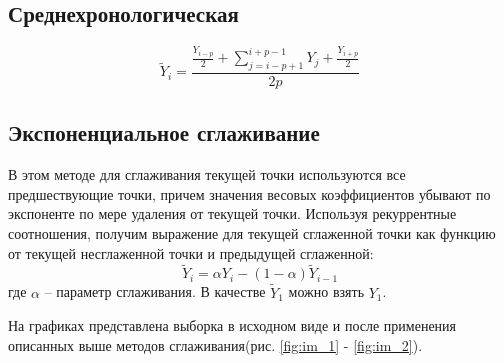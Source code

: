 \documentclass[a4paper,12pt]{article}
\begin{document}
\subsection{Среднехронологическая}
$$\tilde{Y}_i = \frac{\frac{Y_{i-p}}{2} + \sum\limits_{j=i-p+1}^{i+p-1}Y_j+\frac{Y_{i+p}}{2}}{2p}$$

\subsection{Экспоненциальное сглаживание}
В этом методе для сглаживания текущей точки используются все предшествующие точки, причем значения весовых коэффициентов убывают по экспоненте по мере удаления от текущей точки. Используя рекуррентные соотношения, получим выражение для текущей сглаженной точки как функцию от текущей несглаженной точки и предыдущей сглаженной:
$$\tilde{Y}_i = \alpha Y_i - (1 - \alpha)\tilde{Y}_{i-1}$$ 
где $\alpha$ – параметр сглаживания. В качестве $\tilde{Y}_1$ можно взять $Y_1$.


\newpage
На графиках представлена выборка в исходном виде и после применения описанных выше методов сглаживания(рис. \ref{fig:im_1} - \ref{fig:im_2}).
\end{document}
